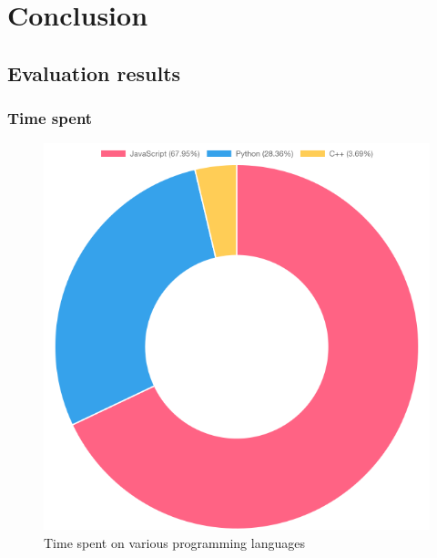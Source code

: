 \chapter{Conclusion}

\section{Evaluation results}

\subsection{Time spent}

\begin{figure}[h]
\centering
\includegraphics[scale=0.5]{04_Artefakte/01_Abbildungen/time-spent-on-languages}
\caption[Time spent on languages]{Time spent on various programming languages\protect}
\label{fig:timeSpentLanguages}
\end{figure}

